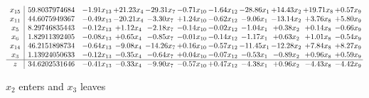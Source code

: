 \documentclass[9pt]{article}
\begin{document}
 \[\begin{array}{c| c c@{\hskip 2pt} c@{\hskip 2pt} c@{\hskip 2pt} c@{\hskip 2pt} c@{\hskip 2pt} c@{\hskip 2pt} c@{\hskip 2pt} c@{\hskip 2pt} c@{\hskip 2pt} }
 x_{15}   &  59.8037974684 & -1.91 x_{13} & + 21.23 x_{4} & -29.31 x_{7} & -0.71 x_{10} & -1.64 x_{12} & -28.86 x_{1} & + 14.43 x_{2} & + 19.71 x_{8} & +  0.57 x_{9}\\
 x_{11}   &  44.6075949367 & -0.49 x_{13} & -20.21 x_{4} & -3.30 x_{7} & +  1.24 x_{10} & -0.62 x_{12} & -9.06 x_{1} & -13.14 x_{2} & +  3.76 x_{8} & +  5.80 x_{9}\\
 x_{5}   &  8.29746835443 & -0.12 x_{13} & +  1.12 x_{4} & -2.18 x_{7} & -0.14 x_{10} & -0.02 x_{12} & -1.04 x_{1} & +  0.38 x_{2} & +  0.14 x_{8} & -0.66 x_{9}\\
 x_{6}   &  1.82911392405 & -0.08 x_{13} & +  0.65 x_{4} & -0.85 x_{7} & -0.01 x_{10} & -0.14 x_{12} & -1.17 x_{1} & +  0.63 x_{2} & +  1.01 x_{8} & -0.54 x_{9}\\
 x_{14}   &  46.2151898734 & -0.64 x_{13} & -9.08 x_{4} & -14.26 x_{7} & +  0.16 x_{10} & -0.57 x_{12} & -11.45 x_{1} & -12.28 x_{2} & +  7.84 x_{8} & +  8.27 x_{9}\\
 x_{3}   &  1.13924050633 & -0.12 x_{13} & -0.35 x_{4} & -0.64 x_{7} & +  0.04 x_{10} & -0.07 x_{12} & -0.53 x_{1} & -0.89 x_{2} & +  0.96 x_{8} & +  0.59 x_{9}\\
\hline
z    &  34.6202531646 & -0.41 x_{13} & -0.33 x_{4} & -9.90 x_{7} & -0.57 x_{10} & +  0.47 x_{12} & -4.38 x_{1} & +  0.96 x_{2} & -4.43 x_{8} & -4.42 x_{9}\\
\end{array}\]


 $ x_{2} $ enters and $ x_{3} $ leaves 
\end{document}
